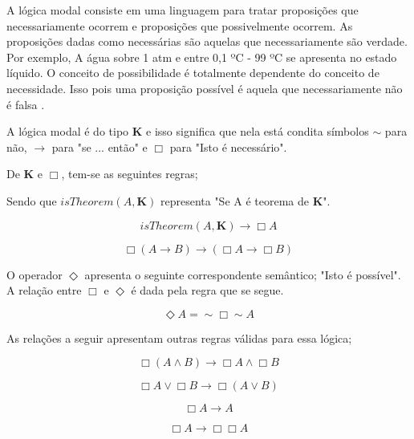 A lógica modal consiste em uma linguagem para tratar proposições que necessariamente ocorrem e proposições que possivelmente ocorrem. As proposições dadas como necessárias são aquelas que necessariamente são verdade. Por exemplo, A água sobre 1 atm e entre 0,1 ºC - 99 ºC se apresenta no estado líquido. O conceito de possibilidade é totalmente dependente do conceito de necessidade. Isso pois uma proposição possível é aquela que necessariamente não é falsa \cite{modallogic}. 

A lógica modal é do tipo \textbf{K} e isso significa que nela está condita símbolos $ \sim $ para não, $ \rightarrow$ para "se ... então" e $\Box$ para "Isto é necessário". 

De \textbf{K} e $\Box$, tem-se as seguintes regras;

Sendo que $isTheorem(A,\textbf{K})$ representa "Se A é teorema de \textbf{K}". 

\begin{equation} 
isTheorem(A,\textbf{K}) \rightarrow \Box A
\end{equation}
\label{ktheorema}

\begin{equation} 
 \Box (A \rightarrow B) \rightarrow (\Box A \rightarrow \Box B) 
\end{equation}
\label{boxdist}

O operador $\Diamond$ apresenta o seguinte correspondente semântico; "Isto é possível". A relação entre $\Box$ e $\Diamond$ é dada pela regra que se segue.

\begin{equation} 
 \Diamond A = \sim\Box\sim A
\end{equation}
\label{dianotboxnota}

As relações a seguir apresentam outras regras válidas para essa lógica;

\begin{equation} 
 \Box (A \wedge B)  \rightarrow \Box A \wedge \Box B
\end{equation}
\label{boxand}

\begin{equation} 
 \Box A \vee \Box B \rightarrow \Box (A \vee B)
\end{equation}
\label{boxaor}

\begin{equation} 
 \Box A \rightarrow A
\end{equation}
\label{boxtoa}

\begin{equation} 
    \Box A \rightarrow \Box\Box A
\end{equation}
\label{aboxbox}

